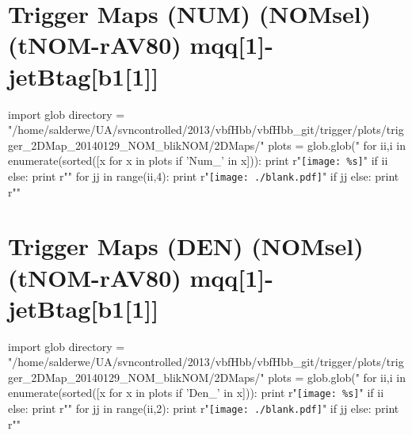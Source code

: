 \documentclass[12pt,english,dvipsnames]{beamer}
\newcommand{\UAoverlay}[0]{%
\begin{tikzpicture}[remember picture,overlay,shift={(current page.north east)}]
\node (zero) at (-1.8cm,-0.93cm) {\texttt{[image: ../logos/CMS.pdf]}\hspace{0.15cm}\texttt{[image: ../logos/CERN.pdf]}\hspace{0.15cm}\texttt{[image: ../logos/UA.pdf]}}; 
\end{tikzpicture}
}
\begin{document}
\section{Trigger Maps (NUM) (NOMsel) (tNOM-rAV80) mqq[1]-jetBtag[b1[1]]}
\begin{frame}[t,fragile]%
\begin{python}
import glob
directory = "/home/salderwe/UA/svncontrolled/2013/vbfHbb/vbfHbb_git/trigger/plots/trigger_2DMap_20140129_NOM_blikNOM/2DMaps/"
plots = glob.glob("%
for ii,i in enumerate(sorted([x for x in plots if 'Num_' in x])):
  print r"\texttt{[image: \%s]}"%
  if ii%
  else: print r"\hfill"
for jj in range(ii,4):
  print r"\texttt{[image: ./blank.pdf]}"
  if jj%
  else: print r"\hfill"
\end{python} 
\end{frame}
\section{Trigger Maps (DEN) (NOMsel) (tNOM-rAV80) mqq[1]-jetBtag[b1[1]]}
\begin{frame}[t,fragile]%
\begin{python}
import glob
directory = "/home/salderwe/UA/svncontrolled/2013/vbfHbb/vbfHbb_git/trigger/plots/trigger_2DMap_20140129_NOM_blikNOM/2DMaps/"
plots = glob.glob("%
for ii,i in enumerate(sorted([x for x in plots if 'Den_' in x])):
  print r"\texttt{[image: \%s]}"%
  if ii%
  else: print r"\hfill"
for jj in range(ii,2):
  print r"\texttt{[image: ./blank.pdf]}"
  if jj%
  else: print r"\hfill"
\end{python} 
\end{frame}
\end{document}
